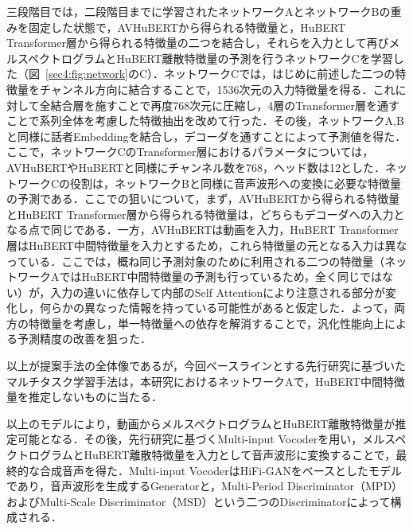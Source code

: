 \documentclass[12pt]{jarticle}
\numberwithin{equation}{section}    %
\numberwithin{figure}{section}      %
\numberwithin{table}{section}      %
\begin{document}
三段階目では，二段階目までに学習されたネットワークAとネットワークBの重みを固定した状態で，AVHuBERTから得られる特徴量と，HuBERT Transformer層から得られる特徴量の二つを結合し，それらを入力として再びメルスペクトログラムとHuBERT離散特徴量の予測を行うネットワークCを学習した（図~\ref{sec4:fig:network}のC）．ネットワークCでは，はじめに前述した二つの特徴量をチャンネル方向に結合することで，1536次元の入力特徴量を得る．これに対して全結合層を施すことで再度768次元に圧縮し，4層のTransformer層を通すことで系列全体を考慮した特徴抽出を改めて行った．その後，ネットワークA,Bと同様に話者Embeddingを結合し，デコーダを通すことによって予測値を得た．ここで，ネットワークCのTransformer層におけるパラメータについては，AVHuBERTやHuBERTと同様にチャンネル数を768，ヘッド数は12とした．ネットワークCの役割は，ネットワークBと同様に音声波形への変換に必要な特徴量の予測である．ここでの狙いについて，まず，AVHuBERTから得られる特徴量とHuBERT Transformer層から得られる特徴量は，どちらもデコーダへの入力となる点で同じである．一方，AVHuBERTは動画を入力，HuBERT Transformer層はHuBERT中間特徴量を入力とするため，これら特徴量の元となる入力は異なっている．ここでは，概ね同じ予測対象のために利用される二つの特徴量（ネットワークAではHuBERT中間特徴量の予測も行っているため，全く同じではない）が，入力の違いに依存して内部のSelf Attentionにより注意される部分が変化し，何らかの異なった情報を持っている可能性があると仮定した．よって，両方の特徴量を考慮し，単一特徴量への依存を解消することで，汎化性能向上による予測精度の改善を狙った．

以上が提案手法の全体像であるが，今回ベースラインとする先行研究\cite{choi2023intelligible}に基づいたマルチタスク学習手法は，本研究におけるネットワークAで，HuBERT中間特徴量を推定しないものに当たる．

以上のモデルにより，動画からメルスペクトログラムとHuBERT離散特徴量が推定可能となる．その後，先行研究\cite{choi2023intelligible}に基づくMulti-input Vocoderを用い，メルスペクトログラムとHuBERT離散特徴量を入力として音声波形に変換することで，最終的な合成音声を得た．Multi-input VocoderはHiFi-GAN\cite{kong2020hifi}をベースとしたモデルであり，音声波形を生成するGeneratorと，Multi-Period Discriminator（MPD）およびMulti-Scale Discriminator（MSD）という二つのDiscriminatorによって構成される．
\end{document}
